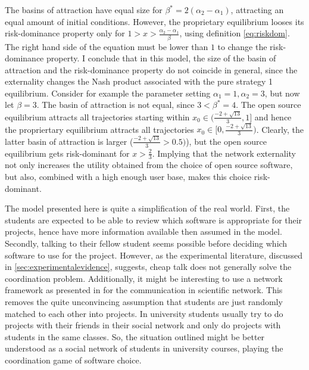 \documentclass[11pt]{article}
\begin{document}
The basins of attraction have equal size for $\beta^* = 2 (\alpha_2 -\alpha_1)$,
attracting an equal amount of initial conditions. However,
the proprietary equilibrium looses its risk-dominance property 
only for $1 > x > \frac{\alpha_2-\alpha_1}{\beta}  $, using definition 
\ref{eq:riskdom}. The right hand side of the equation must be lower than $1$
to change the risk-dominance property. I conclude that in this model, 
the size of the basin of attraction and the risk-dominance property do not
coincide in general, since the externality changes the Nash product associated
with the pure strategy 1 equilibrium. Consider for example the parameter setting 
$\alpha_1 =1, \alpha_2=3$, but now let $\beta=3$. 
The basin of attraction is not equal, since $3<\beta^*= 4$. 
The open source equilibrium attracts all trajectories starting within 
$x_0 \in (\frac{-2+\sqrt{13}}{3},1]$ and hence the propriertary equilibrium attracts
all trajectories $x_0 \in [0,\frac{-2+\sqrt{13}}{3})$. Clearly, the latter basin of 
attraction is larger ($\frac{-2+\sqrt{13}}{3}>0.5)$), 
but the open source equilibrium gets risk-dominant for
$x>\frac 23$. Implying that the network externality not only increases the
utility obtained from the choice of open source software, but also,
combined with a high enough user base, makes this choice risk-dominant.

The model presented here is quite a simplification of the real world. 
First, the students are expected to be able to review which software is 
appropriate for their projects, hence have more information available then 
assumed in the model. Secondly, talking to their fellow student seems
possible before deciding which software to use for the project. 
However, as the experimental literature, discussed in 
\ref{sec:experimentalevidence}, suggests, cheap talk does not generally
solve the coordination problem. 
Additionally, it might be interesting to use a network framework as presented
in \textcite{hanauske} for the communication in scientific network. This 
removes the quite unconvincing assumption that students are just randomly
matched to each other into projects. In university students usually try
to do projects with their friends in their social network and only do
projects with students in the same classes. So, the situation outlined 
might be better understood as a social network of students in 
university courses, playing the coordination game of software choice.
\end{document}
